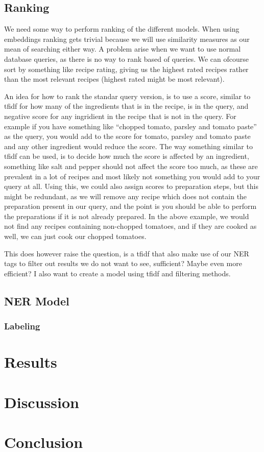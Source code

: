 \documentclass[11pt]{article}
\begin{document}
\subsection{Ranking}
We need some way to perform ranking of the different models.
When using embeddings ranking gets trivial because we will use similarity
measures as our mean of searching either way.
A problem arise when we want to use normal database queries, as there is no way
to rank based of queries.
We can ofcourse sort by something like recipe rating, giving us the highest
rated recipes rather than the most relevant recipes (highest rated might be most
relevant).

An idea for how to rank the standar query version, is to use a score, similar to
tfidf for how many of the ingredients that is in the recipe, is in the query,
and negative score for any ingridient in the recipe that is not in the query.
For example if you have something like ``chopped tomato, parsley and tomato
paste'' as the query, you would add to the score for tomato, parsley and tomato
paste and any other ingredient would reduce the score.
The way something similar to tfidf can be used, is to decide how much the score
is affected by an ingredient, something like salt and pepper should not affect
the score too much, as these are prevalent in a lot of recipes and most likely
not something you would add to your query at all.
Using this, we could also assign scores to preparation steps, but this might be
redundant, as we will remove any recipe which does not contain the preparation
present in our query, and the point is you should be able to perform the
preparations if it is not already prepared.
In the above example, we would not find any recipes containing non-chopped
tomatoes, and if they are cooked as well, we can just cook our chopped tomatoes.

This does however raise the question, is a tfidf that also make use of our NER
tags to filter out results we do not want to see, sufficient? Maybe even more
efficient?
I also want to create a model using tfidf and filtering methods.
\subsection{NER Model}
\subsubsection{Labeling}

\section{Results}
\section{Discussion}
\section{Conclusion}


\end{document}
